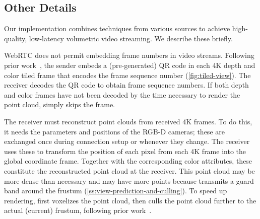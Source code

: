 

\subsection{Other Details}
\label{ss:optimizations}

Our \livo{} implementation combines techniques from various sources to achieve high-quality, low-latency volumetric video streaming. We describe these briefly.

%
WebRTC does not permit embedding frame numbers in video streams.
%
Following prior work~\cite{salsify}, the \livo{} sender embeds a (pre-generated) QR code in each 4K depth and color tiled frame that encodes the frame sequence number (\cref{fig:tiled-view}).
%
The receiver decodes the QR code to obtain frame sequence numbers.
%
If both depth and color frames have not been decoded by the time necessary to render the point cloud, \livo{} simply skips the frame.

%
The receiver must reconstruct point clouds from received 4K frames.
%
To do this, it needs the parameters and positions of the RGB-D cameras; these are exchanged once during connection setup or whenever they change.
%
The receiver uses these to transform the position of each pixel from each 4K frame into the global coordinate frame.
%
Together with the corresponding color attributes, these constitute the reconstructed point cloud at the receiver.
%
This point cloud may be more dense than necessary and may have more points because \livo{} transmits a guard-band around the frustum (\cref{ss:view-prediction-and-culling}).
%
To speed up rendering, \livo{} first voxelizes the point cloud, then culls the point cloud further to the actual (current) frustum, following prior work~\cite{vivo,groot}.

